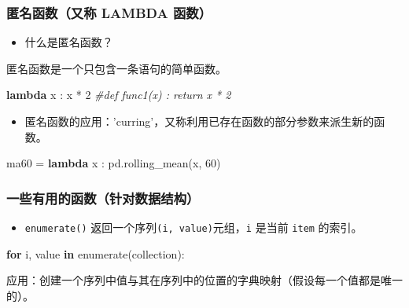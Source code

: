 \documentclass[utf-8]{ctexart}
\newenvironment{Shaded}{}{}
\newcommand{\KeywordTok}[1]{\textcolor[rgb]{0.00,0.44,0.13}{\textbf{#1}}}
\newcommand{\DecValTok}[1]{\textcolor[rgb]{0.25,0.63,0.44}{#1}}
\newcommand{\CommentTok}[1]{\textcolor[rgb]{0.38,0.63,0.69}{\textit{#1}}}
\newcommand{\ControlFlowTok}[1]{\textcolor[rgb]{0.00,0.44,0.13}{\textbf{#1}}}
\newcommand{\OperatorTok}[1]{\textcolor[rgb]{0.40,0.40,0.40}{#1}}
\newcommand{\BuiltInTok}[1]{#1}
\newcommand{\NormalTok}[1]{#1}
\begin{document}
\subsubsection{匿名函数（又称 LAMBDA 函数）}\label{header-n254}

\begin{itemize}
\item
  什么是匿名函数？
\end{itemize}

匿名函数是一个只包含一条语句的简单函数。

\begin{Shaded}
\begin{Highlighting}[]
\KeywordTok{lambda}\NormalTok{ x : x }\OperatorTok{*} \DecValTok{2}
\CommentTok{#def func1(x) : return x * 2}
\end{Highlighting}
\end{Shaded}

\begin{itemize}
\item
  匿名函数的应用：'curring'，又称利用已存在函数的部分参数来派生新的函数。
\end{itemize}

\begin{Shaded}
\begin{Highlighting}[]
\NormalTok{ma60 }\OperatorTok{=} \KeywordTok{lambda}\NormalTok{ x : pd.rolling_mean(x, }\DecValTok{60}\NormalTok{)}
\end{Highlighting}
\end{Shaded}

\subsubsection{一些有用的函数（针对数据结构）}\label{header-n267}

\begin{itemize}
\item
  \texttt{enumerate()} 返回一个序列\texttt{(i,\ value)}元组，\texttt{i}
  是当前 \texttt{item} 的索引。
\end{itemize}

\begin{Shaded}
\begin{Highlighting}[]
\ControlFlowTok{for}\NormalTok{ i, value }\KeywordTok{in} \BuiltInTok{enumerate}\NormalTok{(collection):}
\end{Highlighting}
\end{Shaded}

应用：创建一个序列中值与其在序列中的位置的字典映射（假设每一个值都是唯一的）。
\end{document}
